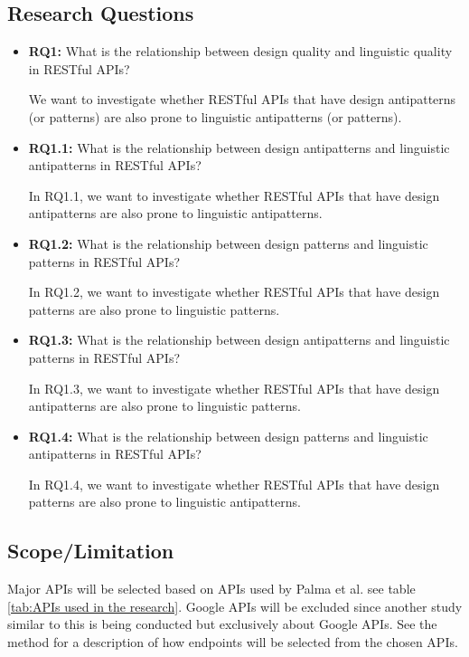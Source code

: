 \documentclass[a4paper,12pt]{article}
\begin{document}
\subsection{Research Questions}

\begin{itemize}
\item \textbf{RQ1:} What is the relationship between design quality and linguistic quality in RESTful APIs?

We want to investigate whether RESTful APIs that have design antipatterns (or patterns) are also prone to linguistic antipatterns (or patterns).

\item \textbf{RQ1.1:} What is the relationship between design antipatterns and linguistic antipatterns in RESTful APIs?

In RQ1.1, we want to investigate whether RESTful APIs that have design antipatterns are also prone to linguistic antipatterns.

\item \textbf{RQ1.2:} What is the relationship between design patterns and linguistic patterns in RESTful APIs?

In RQ1.2, we want to investigate whether RESTful APIs that have design patterns are also prone to linguistic patterns.

\item  \textbf{RQ1.3:} What is the relationship between design antipatterns and linguistic patterns in RESTful APIs?

In RQ1.3, we want to investigate whether RESTful APIs that have design antipatterns are also prone to linguistic patterns.

\item  \textbf{RQ1.4:} What is the relationship between design patterns and linguistic antipatterns in RESTful APIs?

In RQ1.4, we want to investigate whether RESTful APIs that have design patterns are also prone to linguistic antipatterns.

\end{itemize}



\subsection{Scope/Limitation}
Major APIs will be selected based on APIs used by Palma et al. \cite{linguistic} see table \ref{tab:APIs used in the research}. Google APIs will be excluded since another study similar to this is being conducted but exclusively about Google APIs. See the method for a description of how endpoints will be selected from the chosen APIs.
\end{document}
